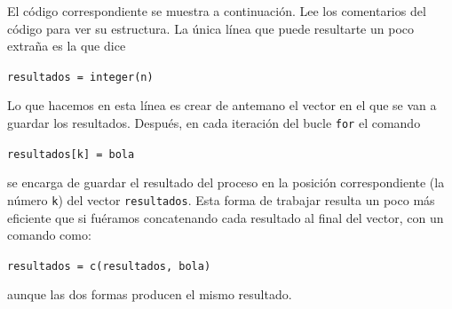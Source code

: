 \documentclass[10pt,a4paper]{article}\usepackage[]{graphicx}\usepackage[]{color}
\newcounter{cont01}
\begin{document}
El código correspondiente se muestra a continuación. Lee los comentarios del código para ver su estructura. La única línea que puede resultarte
un poco extraña es la que dice
\begin{center}
{\tt resultados = integer(n)}
\end{center}
Lo que hacemos en esta línea es crear de antemano el vector en el que se van a guardar los resultados. Después, en cada iteración del bucle {\tt for} el comando
\begin{center}
  {\tt resultados[k] = bola}
\end{center}
se encarga de guardar el resultado del proceso en la posición correspondiente (la número {\tt k}) del vector {\tt resultados}. Esta forma de trabajar resulta un poco más eficiente que si fuéramos concatenando cada resultado al final del vector, con un comando como:
\begin{center}
  {\tt resultados = c(resultados, bola)}
\end{center}
aunque las dos formas producen el mismo resultado.
\end{document}

